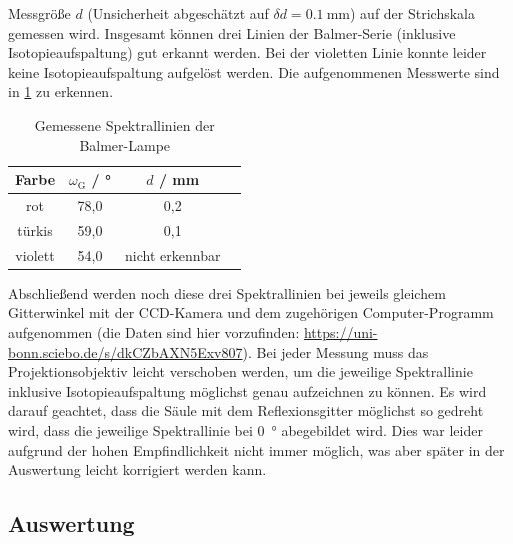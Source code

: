 Messgröße $d$ (Unsicherheit abgeschätzt auf $\delta d = \SI{0,1}{\milli \meter}$) auf der Strichskala gemessen wird. Insgesamt können drei Linien der Balmer-Serie (inklusive Isotopieaufspaltung) gut erkannt werden. Bei der violetten Linie konnte leider keine Isotopieaufspaltung aufgelöst werden. Die aufgenommenen Messwerte sind in \cref{tab:spektrallinien_balmer}
zu erkennen.
\begin{table}[H]
    \centering
    \caption{Gemessene Spektrallinien der Balmer-Lampe}
    \begin{tabular}{c|c|c|c}
        Farbe & $\omega_{\mathrm{G}}$ / \unit{\degree} & $d$ / \unit{\milli \meter} \\
        \hline
        rot & 78,0 & 0,2 \\
        türkis & 59,0 & 0,1 \\
        violett & 54,0 & nicht erkennbar
    \end{tabular}\label{tab:spektrallinien_balmer}
\end{table} Abschließend werden noch diese drei Spektrallinien bei jeweils gleichem Gitterwinkel mit der CCD-Kamera und dem zugehörigen Computer-Programm aufgenommen 
(die Daten sind hier vorzufinden: \url{https://uni-bonn.sciebo.de/s/dkCZbAXN5Exv807}).
Bei jeder Messung muss das Projektionsobjektiv leicht verschoben werden, um die jeweilige Spektrallinie inklusive Isotopieaufspaltung möglichst genau aufzeichnen zu können.
Es wird darauf geachtet, dass die Säule mit dem Reflexionsgitter möglichst so gedreht wird, dass die jeweilige Spektrallinie bei \SI{0}{\degree} abegebildet wird.
Dies war leider aufgrund der hohen Empfindlichkeit nicht immer möglich, was aber später in der Auswertung leicht korrigiert werden kann.

\subsection{Auswertung}\label{subsec:balmer_auswertung}
